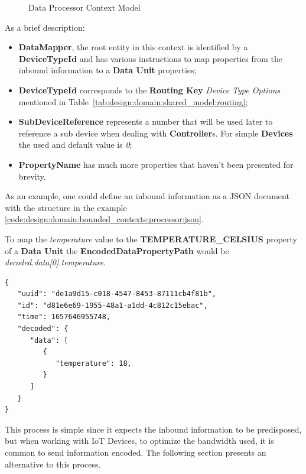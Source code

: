 \begin{figure}[H]
   \centering
  \resizebox{\columnwidth}{!}
  {
     
  }
  \caption[Data Processor Context Model]{Data Processor Context Model}
  \label{fig:design:domain:bounded_contexts:processor:diagram}
\end{figure}

As a brief description:

\begin{itemize}
   \item \textbf{DataMapper}, the root entity in this context is identified by a \textbf{DeviceTypeId} and has various instructions to map properties from the inbound information to a \textbf{Data Unit} properties;
   \item \textbf{DeviceTypeId} corresponds to the \textbf{Routing Key} \textit{Device Type Options} mentioned in Table~\ref{tab:design:domain:shared_model:routing};
   \item \textbf{SubDeviceReference} represents a number that will be used later to reference a sub device when dealing with \textbf{Controller}s. For simple \textbf{Devices} the used and default value is \textit{0}; 
   \item \textbf{PropertyName} has much more properties that haven't been presented for brevity.
\end{itemize}

As an example, one could define an inbound information as a JSON document with the structure in the example \ref{code:design:domain:bounded_contexts:processor:json}. 

To map the \textit{temperature} value to the \textbf{TEMPERATURE\_CELSIUS} property of a \textbf{Data Unit} the \textbf{EncodedDataPropertyPath} would be \textit{decoded.data[0].temperature}.

\begin{lstlisting}[caption=Inbound Information Example, label={code:design:domain:bounded_contexts:processor:json}]
{
   "uuid": "de1a9d15-c018-4547-8453-87111cb4f81b",
   "id": "d81e6e69-1955-48a1-a1dd-4c812c15ebac",
   "time": 1657646955748,
   "decoded": {
      "data": [
         {
            "temperature": 18,
         }
      ]
   }
}
\end{lstlisting}

This process is simple since it expects the inbound information to be predisposed, but when working with \gls{IoT} Devices, to optimize the bandwidth used, it is common to send information encoded. The following section presents an alternative to this process.   

